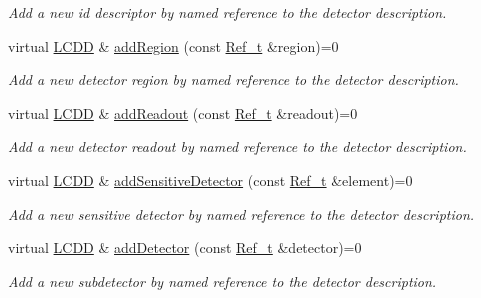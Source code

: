 \begin{DoxyCompactItemize}
\begin{DoxyCompactList}\small\item\em Add a new id descriptor by named reference to the detector description. \item\end{DoxyCompactList}\item 
virtual \hyperlink{class_d_d4hep_1_1_geometry_1_1_l_c_d_d}{LCDD} \& \hyperlink{class_d_d4hep_1_1_geometry_1_1_l_c_d_d_a633c913dcf2a31b52976e5f5bd8a63e2}{addRegion} (const \hyperlink{group___d_d4_h_e_p___g_e_o_m_e_t_r_y_ga40af83be6718bb8828a3d83dc7f8c930}{Ref\_\-t} \&region)=0
\begin{DoxyCompactList}\small\item\em Add a new detector region by named reference to the detector description. \item\end{DoxyCompactList}\item 
virtual \hyperlink{class_d_d4hep_1_1_geometry_1_1_l_c_d_d}{LCDD} \& \hyperlink{class_d_d4hep_1_1_geometry_1_1_l_c_d_d_a9823ad063bd9986e92e66c29f13e28f7}{addReadout} (const \hyperlink{group___d_d4_h_e_p___g_e_o_m_e_t_r_y_ga40af83be6718bb8828a3d83dc7f8c930}{Ref\_\-t} \&readout)=0
\begin{DoxyCompactList}\small\item\em Add a new detector readout by named reference to the detector description. \item\end{DoxyCompactList}\item 
virtual \hyperlink{class_d_d4hep_1_1_geometry_1_1_l_c_d_d}{LCDD} \& \hyperlink{class_d_d4hep_1_1_geometry_1_1_l_c_d_d_aa574186ef096f626835ea6f389769230}{addSensitiveDetector} (const \hyperlink{group___d_d4_h_e_p___g_e_o_m_e_t_r_y_ga40af83be6718bb8828a3d83dc7f8c930}{Ref\_\-t} \&element)=0
\begin{DoxyCompactList}\small\item\em Add a new sensitive detector by named reference to the detector description. \item\end{DoxyCompactList}\item 
virtual \hyperlink{class_d_d4hep_1_1_geometry_1_1_l_c_d_d}{LCDD} \& \hyperlink{class_d_d4hep_1_1_geometry_1_1_l_c_d_d_a53a88518d0ab797a11bd61f9c567f7ac}{addDetector} (const \hyperlink{group___d_d4_h_e_p___g_e_o_m_e_t_r_y_ga40af83be6718bb8828a3d83dc7f8c930}{Ref\_\-t} \&detector)=0
\begin{DoxyCompactList}\small\item\em Add a new subdetector by named reference to the detector description. \item\end{DoxyCompactList}\item 

\end{DoxyCompactItemize}
